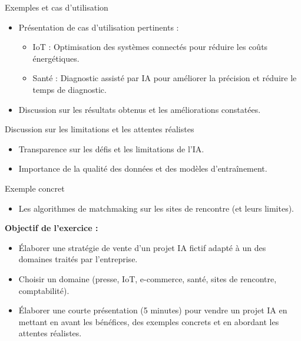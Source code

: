 \begin{frame}{Exemples et cas d'utilisation}
\begin{itemize}
    \item Présentation de cas d'utilisation pertinents :
    \begin{itemize}
    \item IoT : Optimisation des systèmes connectés pour réduire les
      coûts énergétiques.
    \item Santé : Diagnostic assisté par IA pour améliorer la
      précision et réduire le temps de diagnostic.
    \end{itemize}
  \item Discussion sur les résultats obtenus et les améliorations
    constatées.
\end{itemize}
\end{frame}

\begin{frame}{Discussion sur les limitations et les attentes réalistes}
\begin{itemize}
    \item Transparence sur les défis et les limitations de l'IA.
    \item Importance de la qualité des données et des modèles d'entraînement.
\end{itemize}
\end{frame}

\begin{frame}{Exemple concret}
\begin{itemize}
    \item Les algorithmes de matchmaking sur les sites de rencontre (et leurs limites).
\end{itemize}
\end{frame}


\begin{frame}
\textbf{Objectif de l'exercice :}
\begin{itemize}
\item Élaborer une stratégie de vente d'un projet IA fictif adapté à
  un des domaines traités par l'entreprise.
\item Choisir un domaine (presse, IoT, e-commerce, santé, sites de rencontre, comptabilité).
\item Élaborer une courte présentation (5 minutes) pour vendre un
  projet IA en mettant en avant les bénéfices, des exemples concrets
  et en abordant les attentes réalistes.
\end{itemize}
\end{frame}

